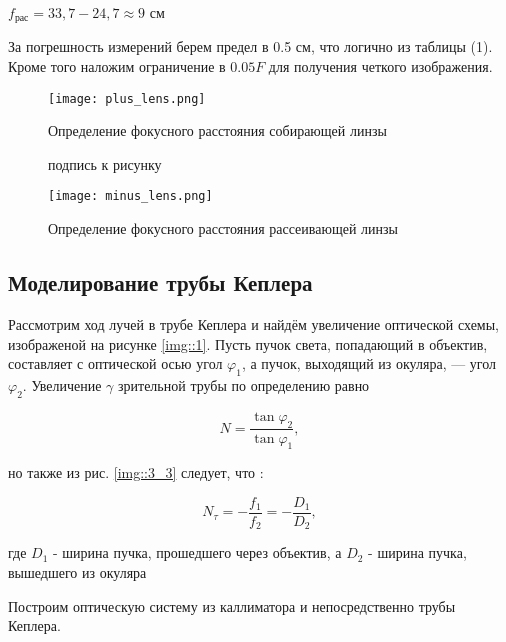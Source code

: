 \begin{center}
    $f_{\text{рас}} = 33,7 - 24,7 \approx 9$ см
\end{center}


За погрешность измерений берем предел в 0.5 см, что логично из таблицы (1). Кроме того наложим ограничение в $0.05F$ для получения четкого изображения.

\begin{figure}[h!]
    \begin{center}
        \begin{minipage}[h!]{0.60\linewidth}
            \texttt{[image: plus\_lens.png]}
            \caption{Определение фокусного расстояния собирающей линзы}  подпись к рисунку
        \label{} 
        \end{minipage}

        \hfill 

        \begin{minipage}[h!]{0.60\linewidth}
            \texttt{[image: minus\_lens.png]}
            \caption{Определение фокусного расстояния рассеивающей линзы}
        \label{}
    \end{minipage}
    \end{center}
\end{figure}
\newpage
\subsection{Моделирование трубы Кеплера}

Рассмотрим ход лучей в трубе Кеплера и найдём увеличение оптической схемы, изображеной 
на рисунке \ref{img::1}. Пусть пучок света, попадающий в объектив, составляет с оптической осью угол $\varphi_1$, а пучок, выходящий из окуляра, — угол $\varphi_2$. Увеличение $\gamma$ зрительной трубы по определению равно

\begin{equation}
    N = \frac{\tan \varphi_2}{\tan \varphi_1},
\end{equation}

но также из рис. \ref{img::3_3} следует, что :

\begin{equation}
    N_{\tau} = -\frac{f_1}{f_2} = -\frac{D_1}{D_2},
\end{equation}

где $D_1$ - ширина пучка, прошедшего через объектив, а $D_2$ - ширина пучка, вышедшего из окуляра

Построим оптическую систему из каллиматора и непосредственно трубы Кеплера. 

